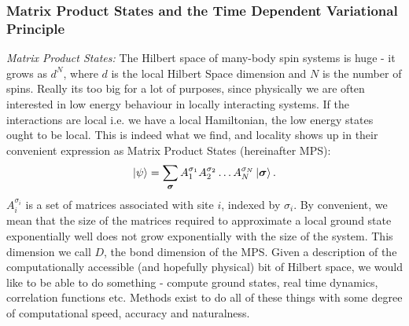 \documentclass{article}
\let\vec\bm
\begin{document}
\subsubsection{Matrix Product States and the Time Dependent Variational Principle}
%
{\it Matrix Product States: } The Hilbert space of many-body spin systems is huge - it grows as $d^N$, where $d$ is the local Hilbert Space dimension and $N$ is the number of spins.
Really its too big for a lot of purposes, since physically we are often interested in low energy behaviour in locally interacting systems.
If the interactions are local i.e. we have a local Hamiltonian, the low energy states ought to be local. 
This is indeed what we find, and locality shows up in their convenient expression as Matrix Product States (hereinafter MPS):
\begin{equation}
    \ket{\psi} = \sum_{\vec{\sigma}} A_1^{\sigma_1}A_2^{\sigma_2}\dots A_N^{\sigma_N} \ket{\vec{\sigma}}.\label{eq:MPS}
\end{equation}
$A_i^{\sigma_i}$ is a set of matrices associated with site $i$, indexed by $\sigma_i$.
By convenient, we mean that the size of the matrices required to approximate a local ground state exponentially well does not grow exponentially with the size of the system.
This dimension we call $D$, the bond dimension of the MPS.
%
Given a description of the computationally accessible (and hopefully physical) bit of Hilbert space, we would like to be able to do something - compute ground states, real time dynamics, correlation functions etc.
Methods exist to do all of these things with some degree of computational speed, accuracy and naturalness. 
%
\end{document}
